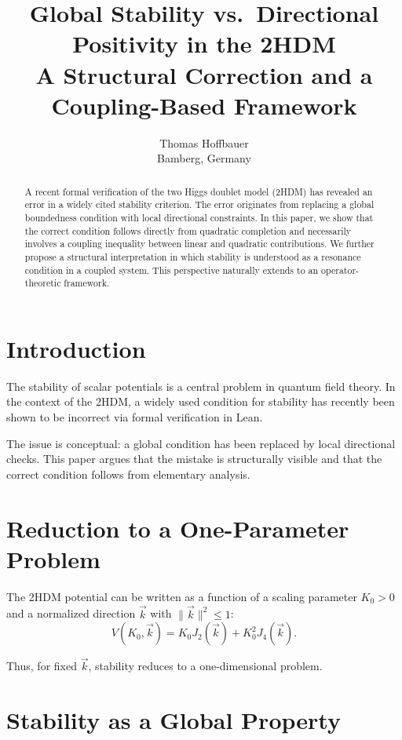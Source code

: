 \documentclass[11pt,a4paper]{article}
\title{
	Global Stability vs.\ Directional Positivity in the 2HDM \\
	\large A Structural Correction and a Coupling-Based Framework
}
\author{
	Thomas Hoffbauer \\
	\small Bamberg, Germany
}
\date{}
\begin{document}
	
	\maketitle
	
	\begin{abstract}
		A recent formal verification of the two Higgs doublet model (2HDM) has revealed an error in a widely cited stability criterion. The error originates from replacing a global boundedness condition with local directional constraints. In this paper, we show that the correct condition follows directly from quadratic completion and necessarily involves a coupling inequality between linear and quadratic contributions. We further propose a structural interpretation in which stability is understood as a resonance condition in a coupled system. This perspective naturally extends to an operator-theoretic framework.
	\end{abstract}
	
	\section{Introduction}
	
	The stability of scalar potentials is a central problem in quantum field theory. In the context of the 2HDM, a widely used condition for stability has recently been shown to be incorrect via formal verification in Lean.
	
	The issue is conceptual: a global condition has been replaced by local directional checks. This paper argues that the mistake is structurally visible and that the correct condition follows from elementary analysis.
	
	\section{Reduction to a One-Parameter Problem}
	
	The 2HDM potential can be written as a function of a scaling parameter $K_0 > 0$ and a normalized direction $\vec{k}$ with $\|\vec{k}\|^2 \leq 1$:
	\begin{equation}
		V(K_0,\vec{k}) = K_0 J_2(\vec{k}) + K_0^2 J_4(\vec{k}).
	\end{equation}
	
	Thus, for fixed $\vec{k}$, stability reduces to a one-dimensional problem.
	
	\section{Stability as a Global Property}
	
\end{document}
